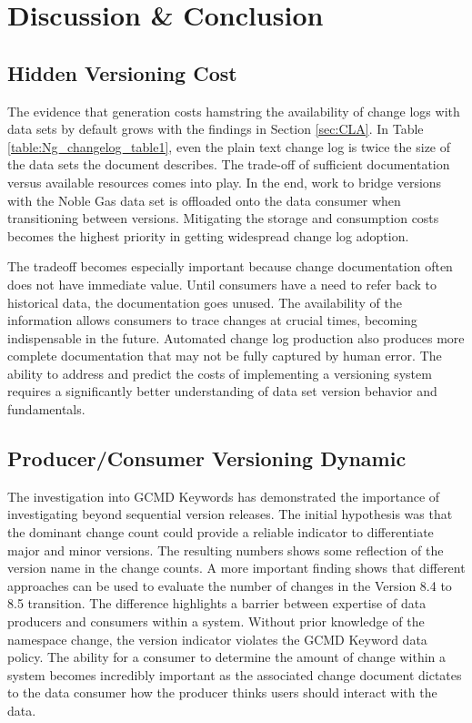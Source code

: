 \chapter{Discussion \& Conclusion}

\section{Hidden Versioning Cost}

The evidence that generation costs hamstring the availability of change logs with data sets by default grows with the findings in Section \ref{sec:CLA}.
In Table \ref{table:Ng_changelog_table1}, even the plain text change log is twice the size of the data sets the document describes.
The trade-off of sufficient documentation versus available resources comes into play.
In the end, work to bridge versions with the Noble Gas data set is offloaded onto the data consumer when transitioning between versions.
Mitigating the storage and consumption costs becomes the highest priority in getting widespread change log adoption.

The tradeoff becomes especially important because change documentation often does not have immediate value.
Until consumers have a need to refer back to historical data, the documentation goes unused.
The availability of the information allows consumers to trace changes at crucial times, becoming indispensable in the future.
Automated change log production also produces more complete documentation that may not be fully captured by human error.
The ability to address and predict the costs of implementing a versioning system requires a significantly better understanding of data set version behavior and fundamentals. 

\section{Producer/Consumer Versioning Dynamic}

The investigation into GCMD Keywords has demonstrated the importance of investigating beyond sequential version releases.  
The initial hypothesis was that the dominant change count could provide a reliable indicator to differentiate major and minor versions.  
The resulting numbers shows some reflection of the version name in the change counts.  
A more important finding shows that different approaches can be used to evaluate the number of changes in the Version 8.4 to 8.5 transition.  
The difference highlights a barrier between expertise of data producers and consumers within a system.  
Without prior knowledge of the namespace change, the version indicator violates the GCMD Keyword data policy.  
The ability for a consumer to determine the amount of change within a system becomes incredibly important as the associated change document dictates to the data consumer how the producer thinks users should interact with the data.

